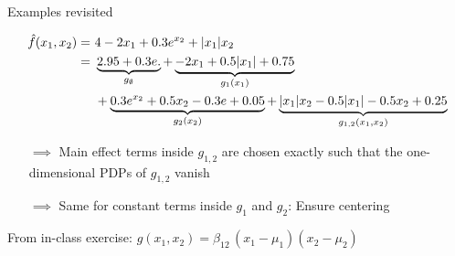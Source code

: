 \documentclass[10pt,compress,t,notes=noshow, xcolor=table]{beamer}
\begin{document}
\begin{frame}{Examples revisited}

    \begin{example}
        \begin{align*}
            \hat{f}(x_1, x_2) =\,&\,4 - 2x_1 + 0.3 e^{x_2} + |x_1|x_2 \\
                =\,&\,\underbrace{2.95 + 0.3 e.}_{g_\emptyset} + \underbrace{-2x_1 + 0.5|x_1| + 0.75}_{g_1(x_1)} \\
                \,&\,+ \underbrace{0.3 e^{x_2} + 0.5x_2 - 0.3e + 0.05}_{g_2(x_2)} + \underbrace{|x_1| x_2 - 0.5 |x_1| - 0.5 x_2 + 0.25}_{g_{1,2}(x_1, x_2)}
        \end{align*}
        \begin{itemize}
            \item[$\implies$] Main effect terms inside $g_{1,2}$ are chosen exactly such that the one-dimensional PDPs of $g_{1,2}$ vanish
            \item[$\implies$] Same for constant terms inside $g_1$ and $g_2$: Ensure centering
        \end{itemize}
    \end{example}

    \pause
    \begin{example}
        From in-class exercise:
        $
        g(x_1,x_2)
         = \beta_{12}\,(x_1-\mu_1)(x_2-\mu_2)
        $
    \end{example}
    
\end{frame}


    
\end{document}
